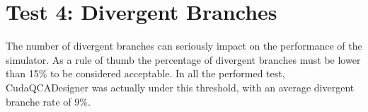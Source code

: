 \section{Test 4: Divergent Branches}
The number of divergent branches can seriously impact on the performance of the simulator. As a rule of thumb the percentage of divergent branches must be lower than 15\% to be considered acceptable. In all the performed test, CudaQCADesigner was actually under this threshold, with an average divergent branche rate of 9\%.   

